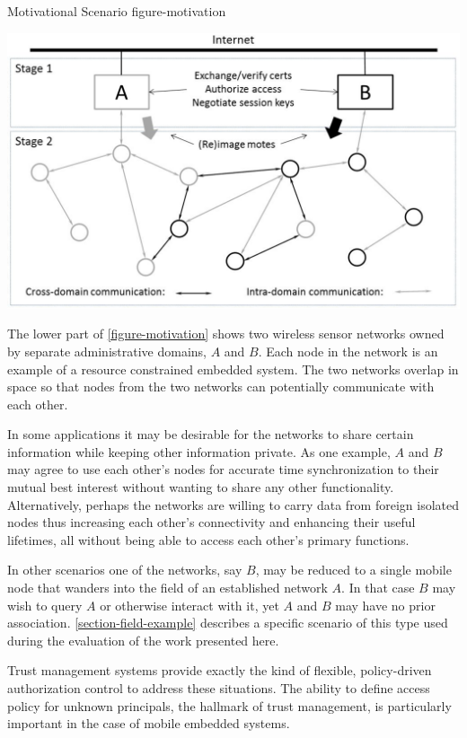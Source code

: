 \begin{fpfig*}[t]
  {Motivational Scenario}
  {figure-motivation}
  \begin{center}
    \includegraphics[scale=.40]{Figures/spartanrpc.eps}
  \end{center}
\end{fpfig*}

The lower part of \autoref{figure-motivation} shows two wireless sensor networks owned by
separate administrative domains, $A$ and $B$. Each node in the network is an example of a
resource constrained embedded system. The two networks overlap in space so that nodes from the
two networks can potentially communicate with each other.

In some applications it may be desirable for the networks to share certain information while
keeping other information private. As one example, $A$ and $B$ may agree to use each other's
nodes for accurate time synchronization to their mutual best interest without wanting to share
any other functionality. Alternatively, perhaps the networks are willing to carry data from
foreign isolated nodes thus increasing each other's connectivity and enhancing their useful
lifetimes, all without being able to access each other's primary functions.

In other scenarios one of the networks, say $B$, may be reduced to a single mobile node that
wanders into the field of an established network $A$. In that case $B$ may wish to query $A$ or
otherwise interact with it, yet $A$ and $B$ may have no prior association.
\autoref{section-field-example} describes a specific scenario of this type used during the
evaluation of the work presented here.

Trust management systems provide exactly the kind of flexible, policy-driven authorization
control to address these situations. The ability to define access policy for unknown principals,
the hallmark of trust management, is particularly important in the case of mobile embedded
systems.

